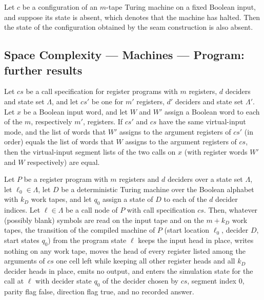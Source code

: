 \begin{lemma}
\label{Complexity.LogProg.seam_state_none}
\leanok
{}
Let $c$ be a configuration of an $m$-tape Turing machine on a fixed Boolean input, and
suppose its state is absent, which denotes that the machine has halted. Then the state
of the configuration obtained by the seam construction is also absent.
\end{lemma}

\subsection*{Space Complexity --- Machines --- Program: further results}

\begin{lemma}
\label{Complexity.LogProg.callSegs_congr}
\leanok
{}
Let $cs$ be a call specification for register programs with $m$ registers, $d$
deciders and state set $\Lambda$, and let $cs'$ be one for $m'$ registers, $d'$ deciders
and state set $\Lambda'$. Let $x$ be a Boolean input word, and let $W$ and $W'$ assign a
Boolean word to each of the $m$, respectively $m'$, registers. If $cs'$ and $cs$ have
the same virtual-input mode, and the list of words that $W'$ assigns to the argument
registers of $cs'$ (in order) equals the list of words that $W$ assigns to the argument
registers of $cs$, then the virtual-input segment lists of the two calls on $x$ (with
register words $W'$ and $W$ respectively) are equal.
\end{lemma}

\begin{lemma}
\label{Complexity.LogProg.compileTM_tr_prog_call}
\leanok
{}
Let $P$ be a register program with $m$ registers and $d$ deciders over a state set
$\Lambda$, let $\ell_0\in\Lambda$, let $D$ be a deterministic Turing machine over the
Boolean alphabet with $k_D$ work tapes, and let $q_0$ assign a state of $D$ to each of
the $d$ decider indices. Let $\ell\in\Lambda$ be a call node of $P$ with call
specification $cs$. Then, whatever (possibly blank) symbols are read on the input tape
and on the $m+k_D$ work tapes, the transition of the compiled machine of $P$ (start
location $\ell_0$, decider $D$, start states $q_0$) from the program state $\ell$ keeps
the input head in place, writes nothing on any work tape, moves the head of every
register listed among the arguments of $cs$ one cell left while keeping all other
register heads and all $k_D$ decider heads in place, emits no output, and enters the
simulation state for the call at $\ell$ with decider state $q_0$ of the decider chosen
by $cs$, segment index $0$, parity flag false, direction flag true, and no recorded
answer.
\end{lemma}

